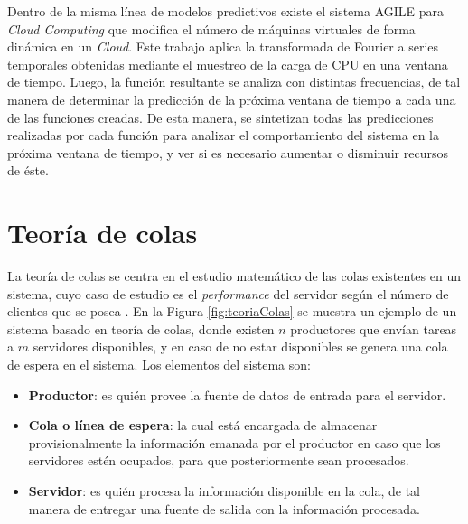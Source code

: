 Dentro de la misma l\'inea de modelos predictivos existe el sistema AGILE \citep{NguyenSGSW13} para \textit{Cloud Computing} que modifica el n\'umero de m\'aquinas virtuales de forma din\'amica en un \textit{Cloud}. Este trabajo aplica la transformada de Fourier \citep{falk2012first} a series temporales obtenidas mediante el muestreo de la carga de CPU en una ventana de tiempo. Luego, la funci\'on resultante se analiza con distintas frecuencias, de tal manera de determinar la predicci\'on de la pr\'oxima ventana de tiempo a cada una de las funciones creadas. De esta manera, se sintetizan \normalsize{todas las predicciones} realizadas por cada funci\'on para analizar el comportamiento del sistema en la pr\'oxima ventana de tiempo, y ver si es necesario aumentar o disminuir recursos de \'este.

\section{Teor\'ia de colas}
\label{sec:teoriaColas}

La teor\'ia de colas se centra en el estudio matem\'atico de las colas existentes en un sistema, cuyo caso de estudio \normalsize{es el \textit{performance} del servidor seg\'un el n\'umero de clientes que se posea} \citep{cooper1972introduction}. En la Figura \ref{fig:teoriaColas} se muestra un ejemplo de un sistema basado en teor\'ia de colas, donde existen $n$ productores que env\'ian tareas a $m$ servidores disponibles, y en caso de no estar disponibles se genera una cola de espera en el sistema. Los elementos del sistema son:

\begin{itemize}
	\item \textbf{Productor}: es qui\'en provee la fuente de datos de entrada para el servidor.
	\item \textbf{Cola o l\'inea de espera}: la cual est\'a encargada de almacenar provisionalmente la informaci\'on emanada por el productor en caso que los servidores est\'en ocupados, para que posteriormente sean procesados.
	\item \textbf{Servidor}: es qui\'en procesa la informaci\'on disponible en la cola, de tal manera de entregar una fuente de salida con la informaci\'on procesada.
\end{itemize}

